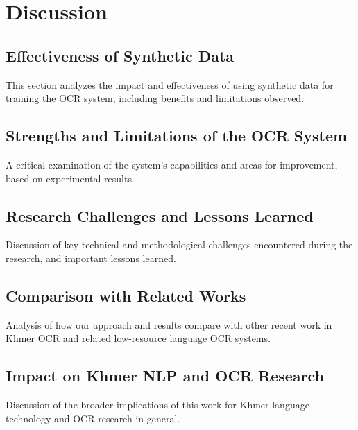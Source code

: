 \chapter{Discussion}
\label{ch:discussion}

\section{Effectiveness of Synthetic Data}
\label{sec:effectiveness}
This section analyzes the impact and effectiveness of using synthetic data for training the OCR system, including benefits and limitations observed.

\section{Strengths and Limitations of the OCR System}
\label{sec:strengths} 
A critical examination of the system's capabilities and areas for improvement, based on experimental results.

\section{Research Challenges and Lessons Learned}
\label{sec:challenges}
Discussion of key technical and methodological challenges encountered during the research, and important lessons learned.

\section{Comparison with Related Works}
\label{sec:related-works}
Analysis of how our approach and results compare with other recent work in Khmer OCR and related low-resource language OCR systems.

\section{Impact on Khmer NLP and OCR Research}
\label{sec:impact}
Discussion of the broader implications of this work for Khmer language technology and OCR research in general.
